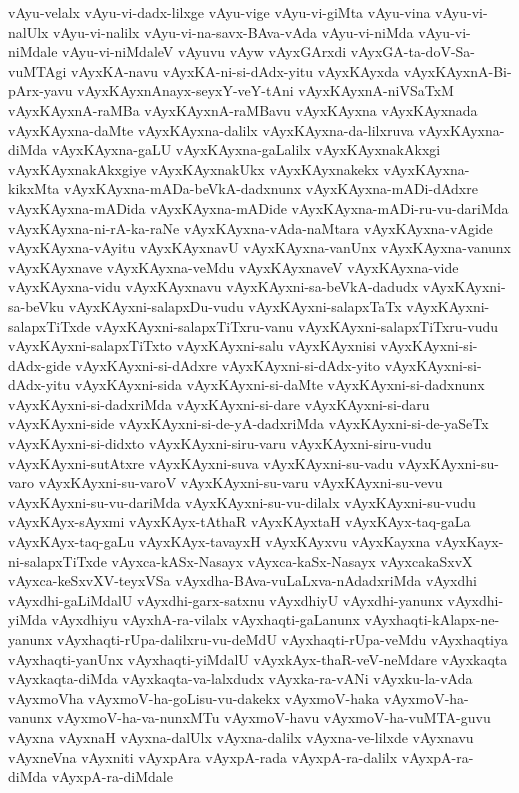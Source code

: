 {vAyu-velalx
vAyu-vi-dadx-lilxge
vAyu-vige
vAyu-vi-giMta
vAyu-vina
vAyu-vi-nalUlx
vAyu-vi-nalilx
vAyu-vi-na-savx-BAva-vAda
vAyu-vi-niMda
vAyu-vi-niMdale
vAyu-vi-niMdaleV
vAyuvu
vAyw
vAyxGArxdi
vAyxGA-ta-doV-Sa-vuMTAgi
vAyxKA-navu
vAyxKA-ni-si-dAdx-yitu
vAyxKAyxda
vAyxKAyxnA-Bi-pArx-yavu
vAyxKAyxnAnayx-seyxY-veY-tAni
vAyxKAyxnA-niVSaTxM
vAyxKAyxnA-raMBa
vAyxKAyxnA-raMBavu
vAyxKAyxna
vAyxKAyxnada
vAyxKAyxna-daMte
vAyxKAyxna-dalilx
vAyxKAyxna-da-lilxruva
vAyxKAyxna-diMda
vAyxKAyxna-gaLU
vAyxKAyxna-gaLalilx
vAyxKAyxnakAkxgi
vAyxKAyxnakAkxgiye
vAyxKAyxnakUkx
vAyxKAyxnakekx
vAyxKAyxna-kikxMta
vAyxKAyxna-mADa-beVkA-dadxnunx
vAyxKAyxna-mADi-dAdxre
vAyxKAyxna-mADida
vAyxKAyxna-mADide
vAyxKAyxna-mADi-ru-vu-dariMda
vAyxKAyxna-ni-rA-ka-raNe
vAyxKAyxna-vAda-naMtara
vAyxKAyxna-vAgide
vAyxKAyxna-vAyitu
vAyxKAyxnavU
vAyxKAyxna-vanUnx
vAyxKAyxna-vanunx
vAyxKAyxnave
vAyxKAyxna-veMdu
vAyxKAyxnaveV
vAyxKAyxna-vide
vAyxKAyxna-vidu
vAyxKAyxnavu
vAyxKAyxni-sa-beVkA-dadudx
vAyxKAyxni-sa-beVku
vAyxKAyxni-salapxDu-vudu
vAyxKAyxni-salapxTaTx
vAyxKAyxni-salapxTiTxde
vAyxKAyxni-salapxTiTxru-vanu
vAyxKAyxni-salapxTiTxru-vudu
vAyxKAyxni-salapxTiTxto
vAyxKAyxni-salu
vAyxKAyxnisi
vAyxKAyxni-si-dAdx-gide
vAyxKAyxni-si-dAdxre
vAyxKAyxni-si-dAdx-yito
vAyxKAyxni-si-dAdx-yitu
vAyxKAyxni-sida
vAyxKAyxni-si-daMte
vAyxKAyxni-si-dadxnunx
vAyxKAyxni-si-dadxriMda
vAyxKAyxni-si-dare
vAyxKAyxni-si-daru
vAyxKAyxni-side
vAyxKAyxni-si-de-yA-dadxriMda
vAyxKAyxni-si-de-yaSeTx
vAyxKAyxni-si-didxto
vAyxKAyxni-siru-varu
vAyxKAyxni-siru-vudu
vAyxKAyxni-sutAtxre
vAyxKAyxni-suva
vAyxKAyxni-su-vadu
vAyxKAyxni-su-varo
vAyxKAyxni-su-varoV
vAyxKAyxni-su-varu
vAyxKAyxni-su-vevu
vAyxKAyxni-su-vu-dariMda
vAyxKAyxni-su-vu-dilalx
vAyxKAyxni-su-vudu
vAyxKAyx-sAyxmi
vAyxKAyx-tAthaR
vAyxKAyxtaH
vAyxKAyx-taq-gaLa
vAyxKAyx-taq-gaLu
vAyxKAyx-tavayxH
vAyxKAyxvu
vAyxKayxna
vAyxKayx-ni-salapxTiTxde
vAyxca-kASx-Nasayx
vAyxca-kaSx-Nasayx
vAyxcakaSxvX
vAyxca-keSxvXV-teyxVSa
vAyxdha-BAva-vuLaLxva-nAdadxriMda
vAyxdhi
vAyxdhi-gaLiMdalU
vAyxdhi-garx-satxnu
vAyxdhiyU
vAyxdhi-yanunx
vAyxdhi-yiMda
vAyxdhiyu
vAyxhA-ra-vilalx
vAyxhaqti-gaLanunx
vAyxhaqti-kAlapx-ne-yanunx
vAyxhaqti-rUpa-dalilxru-vu-deMdU
vAyxhaqti-rUpa-veMdu
vAyxhaqtiya
vAyxhaqti-yanUnx
vAyxhaqti-yiMdalU
vAyxkAyx-thaR-veV-neMdare
vAyxkaqta
vAyxkaqta-diMda
vAyxkaqta-va-lalxdudx
vAyxka-ra-vANi
vAyxku-la-vAda
vAyxmoVha
vAyxmoV-ha-goLisu-vu-dakekx
vAyxmoV-haka
vAyxmoV-ha-vanunx
vAyxmoV-ha-va-nunxMTu
vAyxmoV-havu
vAyxmoV-ha-vuMTA-guvu
vAyxna
vAyxnaH
vAyxna-dalUlx
vAyxna-dalilx
vAyxna-ve-lilxde
vAyxnavu
vAyxneVna
vAyxniti
vAyxpAra
vAyxpA-rada
vAyxpA-ra-dalilx
vAyxpA-ra-diMda
vAyxpA-ra-diMdale
}
